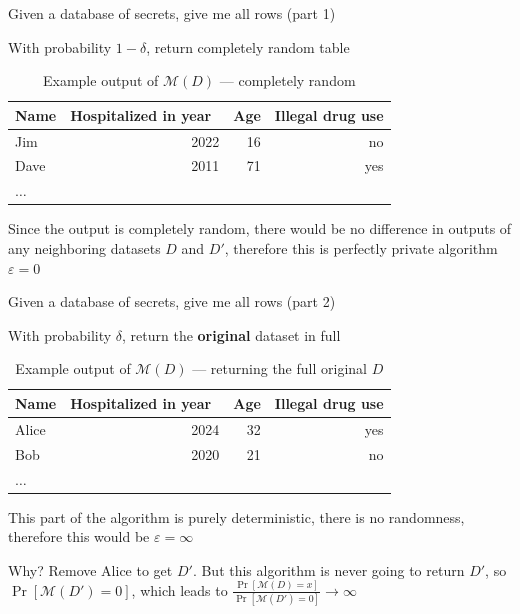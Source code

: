 \documentclass[12pt,aspectratio=169,handout]{beamer}
\begin{document}
\begin{frame}{Given a database of secrets, give me all rows (part 1)}

With probability $1 - \delta$, return completely random table

\begin{table}
\footnotesize
\begin{tabular}{lrrr} \toprule
Name & Hospitalized in year & Age & Illegal drug use \\ \midrule
Jim & 2022 & 16 & no \\
Dave & 2011 & 71 & yes \\
$\ldots$ & & & \\ \bottomrule
\end{tabular}
\caption{Example output of $\mathcal{M}(D)$ --- completely random}
\end{table}

Since the output is completely random, there would be no difference in outputs of any neighboring datasets $D$ and $D'$, therefore this is perfectly private algorithm $\varepsilon = 0$

\end{frame}


\begin{frame}{Given a database of secrets, give me all rows (part 2)}

With probability $\delta$, return the \textbf{original} dataset in full

\begin{table}
\scriptsize
\begin{tabular}{lrrr} \toprule
Name & Hospitalized in year & Age & Illegal drug use \\ \midrule
Alice & 2024 & 32 & yes \\
Bob & 2020 & 21 & no \\
$\ldots$ & & & \\ \bottomrule
\end{tabular}
\caption{Example output of $\mathcal{M}(D)$ --- returning the full original $D$}
\end{table}

This part of the algorithm is purely deterministic, there is no randomness, therefore this would be $\varepsilon = \infty$

\footnotesize{Why? Remove Alice to get $D'$. But this algorithm is never going to return $D'$, so $\Pr[\mathcal{M}(D') = 0]$, which leads to $\frac{\Pr[\mathcal{M}(D) = x]}{\Pr[\mathcal{M}(D') = 0]} \to \infty$}

\end{frame}
\end{document}
